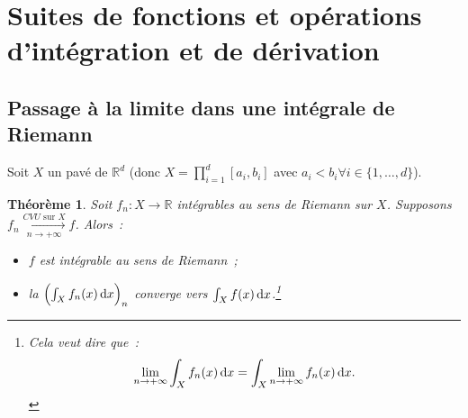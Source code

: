 \documentclass{report}
\newtheorem{thm}{Théorème}[chapter]
\theoremstyle{definition}
\theoremstyle{remark}
\newcommand{\R}{\mathbb R}
\newcommand{\CONV}[5]{\xrightarrow[#2 \to #3]{#4 \text{ #5 } #1}}
\newcommand{\CVU}[3]{\CONV{#1}{#2}{#3}{CVU}{sur}}
\newcommand{\pinfty}{{+\infty}}
\begin{document}
	\section{Suites de fonctions et opérations d'intégration et de dérivation}
		\subsection{Passage à la limite dans une intégrale de Riemann}
			Soit $X$ un pavé de $\R^d$ (donc $X = \prod_{i=1}^d[a_i, b_i]$ avec $a_i < b_i \forall i \in \{1, \ldots, d\}$).

			\begin{thm} Soit $f_n : X \to \R$ intégrables au sens de Riemann sur $X$. Supposons $f_n \CVU Xn\pinfty f$. Alors~:
			\begin{itemize}
				\item $f$ est intégrable au sens de Riemann~;
				\item la $\left(\int_X f_n(x)\dif x\right)_n$ converge vers $\int_Xf(x)\dif x$.\footnote{Cela veut dire que~:
					\[\lim_{n \to \pinfty}\int_X f_n(x)\dif x = \int_X \lim_{n \to \pinfty} f_n(x)\dif x.\]}
			\end{itemize}
			\end{thm}
\end{document}
